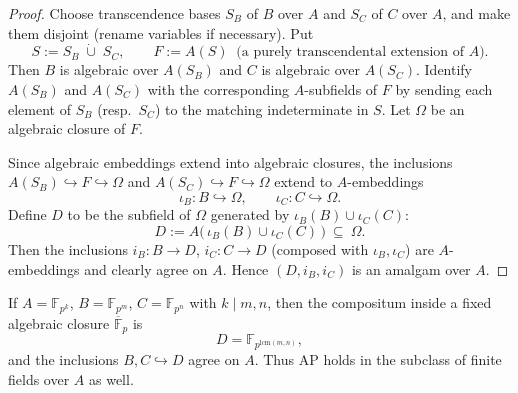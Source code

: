 \begin{proof}
    Choose transcendence bases $S_B$ of $B$ over $A$ and $S_C$ of $C$ over $A$,
    and make them disjoint (rename variables if necessary). Put
    \[
        S:=S_B\;\dot\cup\;S_C,\qquad F:=A(S)\ \text{ (a purely transcendental extension of $A$).}
    \]
    Then $B$ is algebraic over $A(S_B)$ and $C$ is algebraic over $A(S_C)$.
    Identify $A(S_B)$ and $A(S_C)$ with the corresponding $A$-subfields of $F$
    by sending each element of $S_B$ (resp.\ $S_C$) to the matching indeterminate in $S$.
    Let $\Omega$ be an algebraic closure of $F$.

    Since algebraic embeddings extend into algebraic closures, the inclusions
    $A(S_B)\hookrightarrow F\hookrightarrow \Omega$ and $A(S_C)\hookrightarrow F\hookrightarrow \Omega$
    extend to $A$-embeddings
    \[
        \iota_B\colon B\hookrightarrow \Omega,\qquad \iota_C\colon C\hookrightarrow \Omega.
    \]
    Define $D$ to be the subfield of $\Omega$ generated by $\iota_B(B)\cup \iota_C(C)$:
    \[
        D:=A\big(\,\iota_B(B)\cup \iota_C(C)\,\big)\ \subseteq\ \Omega.
    \]
    Then the inclusions $i_B\colon B\to D$, $i_C\colon C\to D$ (composed with $\iota_B,\iota_C$)
    are $A$-embeddings and clearly agree on $A$. Hence $(D,i_B,i_C)$ is an amalgam over $A$.
\end{proof}

\begin{remark}
    If $A=\mathbb{F}_{p^k}$, $B=\mathbb{F}_{p^m}$, $C=\mathbb{F}_{p^n}$ with $k\mid m,n$,
    then the compositum inside a fixed algebraic closure $\overline{\mathbb{F}}_p$ is
    \[
        D=\mathbb{F}_{p^{\mathrm{lcm}(m,n)}},
    \]
    and the inclusions $B,C\hookrightarrow D$ agree on $A$. Thus AP holds in the subclass of finite fields over $A$ as well.
\end{remark}



